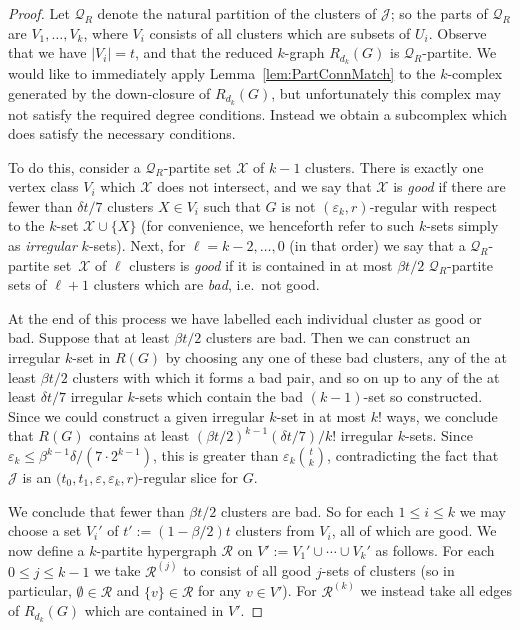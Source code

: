 \documentclass[12pt,a4paper]{amsart}
\let\eps\varepsilon
\newcommand{\cR}{\mathcal{R}}
\newcommand{\cJ}{\mathcal{J}}
\newcommand{\cX}{\mathcal{X}}
\newcommand{\Qart}{\mathcal{Q}}
\begin{document}
\begin{proof}
Let $\Qart_R$ denote the natural partition of the clusters of $\cJ$; so the
parts of $\Qart_R$ are $V_1, \dots, V_k$, where $V_i$ consists of all clusters
which are subsets of $U_i$. Observe that we have $|V_i| = t$, and that the
reduced $k$-graph $R_{d_k}(G)$ is $\Qart_R$-partite. We would like to
immediately apply Lemma~\ref{lem:PartConnMatch} to the $k$-complex generated by
the down-closure of $R_{d_k}(G)$, but unfortunately this complex may not
satisfy the required degree conditions. Instead we obtain a subcomplex which
does satisfy the necessary conditions.

To do this, consider a $\Qart_R$-partite set $\cX$ of $k-1$ clusters. There is
exactly one vertex class $V_i$ which $\cX$ does not intersect, and we say that
$\cX$ is \emph{good} if there are fewer than $\delta t/7$ clusters $X \in
V_i$ such that $G$ is not $(\eps_k,r)$-regular with respect to the $k$-set $\cX \cup \{X\}$ (for convenience, we henceforth refer to such $k$-sets simply
as \emph{irregular} $k$-sets). Next, for $\ell=k-2,\dots,0$ (in that order)
we say that a $\Qart_R$-partite set~$\cX$ of $\ell$ clusters is \emph{good} if
it is contained in at most $\beta t/2$ $\Qart_R$-partite sets of $\ell+1$
clusters which are \emph{bad}, i.e.~not good.

At the end of this process we have labelled each individual cluster as good or bad. 
Suppose that at least $\beta t/2$ clusters are bad. 
Then we can construct an irregular $k$-set in $R(G)$ by choosing any one
of these bad clusters, any of the at least $\beta t/2$ clusters with
which it forms a bad pair, and so on up to any of the at least $\delta
t/7$ irregular $k$-sets which contain the bad $(k-1)$-set so constructed. Since we
could construct a given irregular $k$-set in at most $k!$ ways, we conclude
that $R(G)$ contains at least $(\beta t/2)^{k-1}(\delta t/7)/k!$
irregular $k$-sets. Since $\eps_k \leq \beta^{k-1}\delta/(7\cdot 2^{k-1})$,
this is greater than $\eps_k\binom{t}{k}$, contradicting the fact that
$\cJ$ is an $\big(t_0,t_1,\eps,\eps_k,r\big)$-regular slice for $G$.

We conclude that fewer than $\beta t/2$ clusters are bad. So for each $1
\leq i \leq k$ we may choose a set $V_i'$ of $t' := (1 - \beta/2)t$
clusters from $V_i$, all of which are good. We now define a $k$-partite
hypergraph $\cR$ on $V' := V_1' \cup \cdots \cup V_k'$ as follows. For each $0
\leq j \leq k-1$ we take $\cR^{(j)}$ to consist of all good $j$-sets of
clusters (so in particular, $\emptyset \in \cR$ and $\{v\} \in \cR$ for any $v
\in V'$). For $\cR^{(k)}$ we instead take all edges of $R_{d_k}(G)$ which are
contained in $V'$.


\end{proof}
\end{document}
